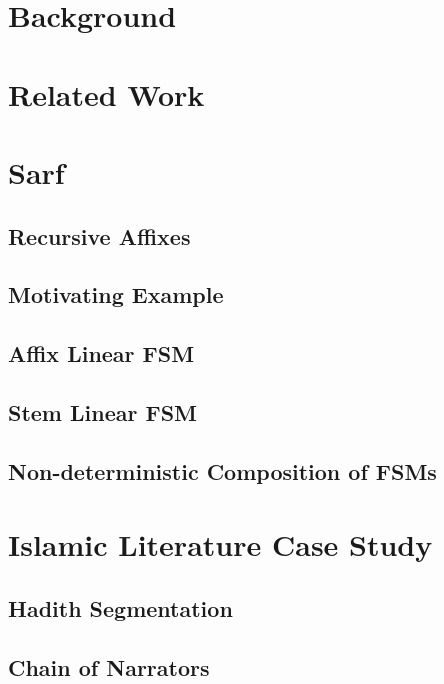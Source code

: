 \documentclass[11pt,letterpaper]{article}
\begin{document}


\section{Background}

\section{Related Work }

\section{Sarf}

\subsection{Recursive Affixes}

\subsection{Motivating Example}

\subsection{Affix Linear FSM}

\subsection{Stem Linear FSM}

\subsection{Non-deterministic Composition of FSMs}

\section{Islamic Literature Case Study}

\subsection{Hadith Segmentation}

\subsection{Chain of Narrators} 
\end{document}
